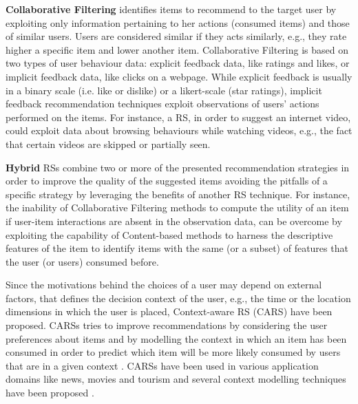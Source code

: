 \noindent\textbf{Collaborative Filtering} \cite{cf:koren} identifies items to recommend to the target user by exploiting only information pertaining to her actions (consumed items) and those of similar users. 
Users are considered similar if they acts similarly, e.g., they rate higher a specific item and lower another item. Collaborative Filtering is based on two types of user behaviour data: explicit feedback data, like ratings and likes, or implicit feedback data, like clicks on a webpage.  While explicit feedback is usually in a binary scale (i.e. like or dislike) or a likert-scale (star ratings), implicit feedback \cite{Hu2008,Pan2008,gurabnov:2016} recommendation techniques exploit observations of users' actions performed on the items. For instance, a RS, in order to suggest an internet video, could exploit data about browsing behaviours while watching videos, e.g., the fact that certain videos are skipped or partially seen.\newline

\noindent\textbf{Hybrid} RSs \cite{hybrid:RSdef} combine two or more of the presented recommendation strategies in order to improve the quality of the suggested items avoiding the pitfalls of a specific strategy by leveraging the benefits of another RS technique. For instance, the inability of Collaborative Filtering methods to compute the utility of an item if user-item interactions are absent in the observation data, can be overcome by exploiting the capability of Content-based methods to harness the descriptive features of the item to identify items with the same (or a subset) of features that the user (or users) consumed before.\newline


Since the motivations behind the choices of a user may depend on external factors, that defines the decision context of the user, e.g., the time or the location dimensions in which the user is placed, Context-aware RS (CARS) have been proposed. CARSs tries to improve recommendations by considering the user preferences about items and by modelling the context in which an item has been consumed in order to predict which item will be more likely consumed by users that are in a given context \cite{adomavicius:2011}. CARSs have been used in various application domains like news, movies and tourism \cite{lommatzsch:news:2017, adomavicius:movie:2005, braunhofer:sts:2015} and several context modelling techniques have been proposed \cite{baltrunas:2012,braunhofer:2017}. \newline


